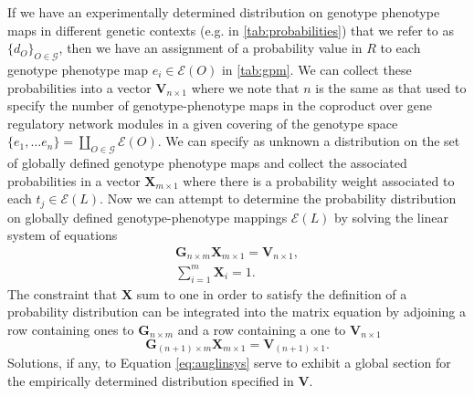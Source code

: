 If we have an experimentally determined distribution on genotype phenotype maps in different genetic contexts (e.g. in \ref{tab:probabilities}) that we refer to as $\{d_O\}_{O \in \mathcal{G}}$, then we have an assignment of a probability value in $R$ to each genotype phenotype map $e_i \in \mathcal{E}(O)$ in \ref{tab:gpm}. We can collect these probabilities into a vector $\mathbf{V}_{n \times 1}$ where we note that $n$ is the same as that used to specify the number of genotype-phenotype maps in the coproduct over gene regulatory network modules in a given covering of the genotype space $\{e_1, \ldots e_n\} = \coprod_{O \in \mathcal{G}} \mathcal{E}(O)$. We can specify as unknown a distribution on the set of globally defined genotype phenotype maps and collect the associated probabilities in a vector $\mathbf{X}_{m \times 1}$ where there is a probability weight associated to each $t_j \in \mathcal{E}(L)$. Now we can attempt to determine the probability distribution on globally defined genotype-phenotype mappings $\mathcal{E}(L)$ by solving the linear system of equations
\begin{equation}
\begin{split}
\mathbf{G}_{n \times m} \mathbf{X}_{m \times 1} = \mathbf{V}_{n \times 1},\\
\sum_{i=1}^{m} \mathbf{X}_{i} = 1.
\end{split}
\end{equation}
The constraint that $\mathbf{X}$ sum to one in order to satisfy the definition of a probability distribution can be integrated into the matrix equation by adjoining a row containing ones to $\mathbf{G}_{n \times m}$ and a row containing a one to $\mathbf{V}_{n \times 1}$
\begin{equation}\label{eq:auglinsys}
\mathbf{G}_{(n + 1) \times m} \mathbf{X}_{m \times 1} = \mathbf{V}_{(n + 1) \times 1}.
\end{equation}
Solutions, if any, to Equation \ref{eq:auglinsys} serve to exhibit a global section for the empirically determined distribution specified in $\mathbf{V}$.


